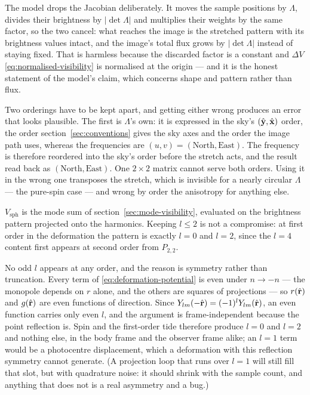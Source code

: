 The model drops the Jacobian deliberately.  It moves the sample positions by $\Lambda$,
divides their brightness by $|\det\Lambda|$ and multiplies their weights by the same factor,
so the two cancel: what reaches the image is the stretched pattern with its brightness values
intact, and the image's total flux grows by $|\det\Lambda|$ instead of staying fixed.  That is
harmless because the discarded factor is a constant and $\Delta V$
\eqref{eq:normalised-visibility} is normalised at the origin --- and it is the honest
statement of the model's claim, which concerns shape and pattern rather than flux.

Two orderings have to be kept apart, and getting either wrong produces an error that looks
plausible.  The first is $\Lambda$'s own: it is expressed in the sky's
$(\hat{\mathbf y},\hat{\mathbf x})$ order, the order section~\ref{sec:conventions} gives the sky
axes and the order the image path uses, whereas the frequencies are $(u,v) =
(\text{North},\text{East})$.  The frequency is therefore reordered into the sky's order
before the stretch acts, and the result read back as $(\text{North},\text{East})$.  One
$2\times2$ matrix cannot serve both orders.  Using it in the wrong one transposes the
stretch, which is invisible for a nearly circular $\Lambda$ --- the pure-spin case --- and
wrong by order the anisotropy for anything else.

$V_\text{sph}$ is the mode sum of section~\ref{sec:mode-visibility}, evaluated on the
brightness pattern projected onto the harmonics.  Keeping $l \le 2$ is not a compromise: at
first order in the deformation the pattern is exactly $l = 0$ and $l = 2$, since the
$l = 4$ content first appears at second order from $P_{2,2}$.

No odd $l$ appears at any order, and the reason is symmetry rather than truncation.  Every
term of \eqref{eq:deformation-potential} is even under $n \to -n$ --- the monopole depends
on $r$ alone, and the others are squares of projections --- so $r(\hat{\mathbf r})$ and $g(\hat{\mathbf r})$ are even
functions of direction.  Since $Y_{lm}(-\hat{\mathbf r}) = (-1)^l Y_{lm}(\hat{\mathbf r})$, an even function carries only
even $l$, and the argument is frame-independent because the point reflection is.  Spin and
the first-order tide therefore produce $l = 0$ and $l = 2$ and nothing else, in the body
frame and the observer frame alike; an $l = 1$ term would be a photocentre displacement,
which a deformation with this reflection symmetry cannot generate.  (A projection loop that
runs over $l = 1$ will still fill that slot, but with quadrature noise: it should shrink
with the sample count, and anything that does not is a real asymmetry and a bug.)

